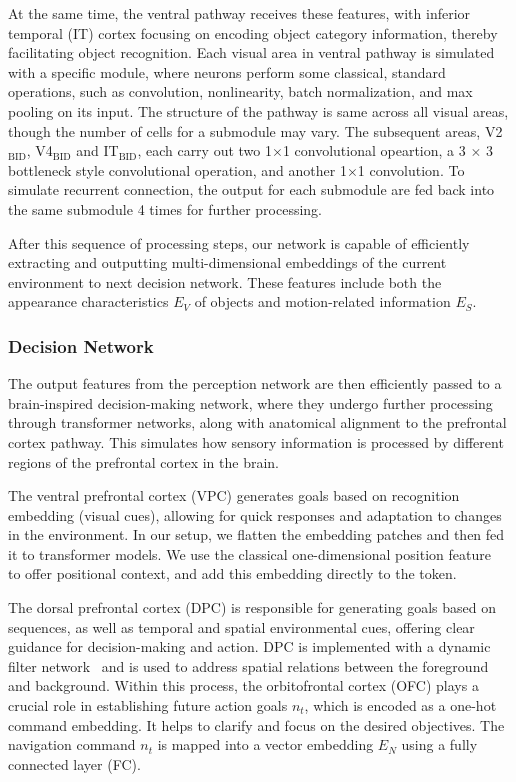 At the same time, the ventral pathway receives these features, with inferior temporal (IT) cortex focusing on encoding object category information, thereby facilitating object recognition.
Each visual area in ventral pathway is simulated with a specific module, where neurons perform some classical, standard operations, such as convolution, nonlinearity, batch normalization, and max pooling on its input. 
The structure of the pathway is same across all visual areas, though the number of cells for a submodule may vary.
The subsequent areas, V2$_\text{BID}$, V4$_\text{BID}$ and IT$_\text{BID}$, each carry out two 1$\times$1 convolutional opeartion, a 3 $ \times $ 3 bottleneck style convolutional operation, and another 1$\times$1 convolution. 
To simulate recurrent connection, the output for each submodule are fed back into the same submodule 4 times for further processing.


%
After this sequence of processing steps, our network is capable of efficiently extracting and outputting multi-dimensional embeddings of the current environment to next decision network. 
These features include both the appearance characteristics $ E_V $ of objects and motion-related information $ E_S $.



\subsubsection{Decision Network}
The output features from the perception network are then efficiently passed to a brain-inspired decision-making network, where they undergo further processing through transformer networks, along with anatomical alignment to the prefrontal cortex pathway. 
This simulates how sensory information is processed by different regions of the prefrontal cortex in the brain.
%


The ventral prefrontal cortex (VPC) generates goals based on recognition embedding (visual cues), allowing for quick responses and adaptation to changes in the environment\cite{passingham2012neurobiology}.
%
In our setup, we flatten the embedding patches and then fed it to transformer models.
We use the classical one-dimensional position feature~\cite{Alexey:2021} to offer positional context, and add this embedding directly to the token.


The dorsal prefrontal cortex (DPC) is responsible for generating goals based on sequences, as well as temporal and spatial environmental cues, offering clear guidance for decision-making and action\cite{passingham2012neurobiology}.
DPC is implemented with a dynamic filter network~\cite{jia2016dynamic} and is used to address spatial relations between the foreground and background.
Within this process, the orbitofrontal cortex (OFC) plays a crucial role in establishing future action goals $n_t$, which is encoded as a one-hot command embedding.
It helps to clarify and focus on the desired objectives. 
The navigation command $n_t$ is mapped into a vector embedding $E_N$ using a fully connected layer (FC).



